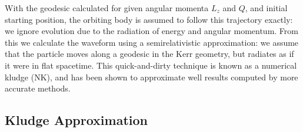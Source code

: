 With the geodesic calculated for given angular momenta $L_z$ and $Q$, and initial starting position, the orbiting body is assumed to follow this trajectory exactly: we ignore evolution due to the radiation of energy and angular momentum. From this we calculate the waveform using a semirelativistic approximation\cite{Ruffini1981}: we assume that the particle moves along a geodesic in the Kerr geometry, but radiates as if it were in flat spacetime. This quick-and-dirty technique is known as a numerical kludge (NK), and has been shown to approximate well results computed by more accurate methods\cite{Babak2007}.

\subsection{Kludge Approximation}

